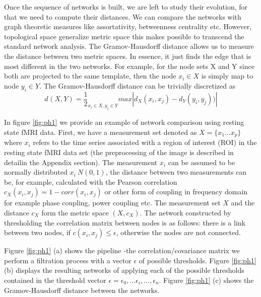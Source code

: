 \documentclass[onecollarge,runningheads]{svjour2}
\begin{document}
Once the sequence of networks is built, we are left to study their evolution, for that we need to compute their distances. We can compare the networks with graph theoretic measures like assortativity, betweenness centrality etc. However, topological space generalize metric space this makes possible to transcend the standard network analysis.
The Gramov-Hausdorff distance allows us to measure the distance between two metric spaces. In essence, it just finds the edge that is most different in the two networks. For example, for the node sets X and Y since both are projected to the same template, then the node $x_i \in X$ is simply map to node $y_i \in Y$. The Gramov-Hausdorff distance can be trivially discretized as
\begin{equation}
d_{}(X,Y) = \frac{1}{2}_{x_i \in X, y_j \in Y} max |d_X(x_i,x_j) - d_Y(y_i,y_j))|
\end{equation}

In figure \ref{fig:ph1} we provide an example of network comparison using resting state fMRI data.
First, we have a measurement set denoted as $X= \{x_1 ... x_p\}$ where $x_i$ refers to the time series associated with a region of interest (ROI) in the resting state fMRI data set (the preprocessing of the image is described in detailin the Appendix section).
The measurement $x_i$ can be assumed to be normally distributed $x_i ~ N(0,1)$, the distance between two measurements can be, for example, calculated with the Pearson correlation $c_{X}(x_i,x_j)= 1 - corr(x_i,x_j)$ or other form of coupling in frequency domain for example phase coupling, power coupling etc.
The measurement set $X$ and the distance $c_X$ form the metric space $(X,c_X)$. The network constructed by thresholding the correlation matrix between nodes is as follows: there is a link between two nodes, if $c(x_i,x_j) \leq \epsilon$, otherwise the nodes are not connected.

Figure \ref{fig:ph1} (a) shows the pipeline -the correlation/covariance matrix we perform a filtration process with a vector $\epsilon$ of possible thresholds.
Figure \ref{fig:ph1} (b) displays the resulting networks of applying each of the possible thresholds contained in the threshold vector $\epsilon= \epsilon_0,... \epsilon_i, ..., \epsilon_n$. Figure \ref{fig:ph1} (c) shows the Gramov-Hausdorff distance between the networks.

\end{document}
